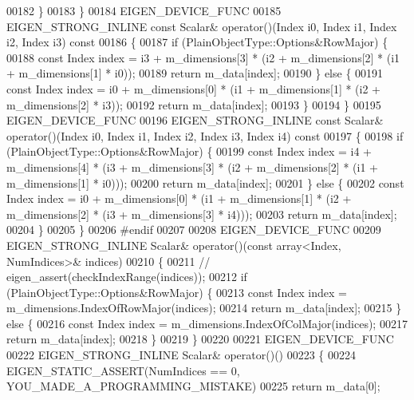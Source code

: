 \begin{DoxyCode}
00182       \}
00183     \}
00184     EIGEN\_DEVICE\_FUNC
00185     EIGEN\_STRONG\_INLINE \textcolor{keyword}{const} Scalar& operator()(Index i0, Index i1, Index i2, Index i3)\textcolor{keyword}{ const}
00186 \textcolor{keyword}{    }\{
00187       \textcolor{keywordflow}{if} (PlainObjectType::Options&RowMajor) \{
00188         \textcolor{keyword}{const} Index index = i3 + m\_dimensions[3] * (i2 + m\_dimensions[2] * (i1 + m\_dimensions[1] * i0));
00189         \textcolor{keywordflow}{return} m\_data[index];
00190       \} \textcolor{keywordflow}{else} \{
00191         \textcolor{keyword}{const} Index index = i0 + m\_dimensions[0] * (i1 + m\_dimensions[1] * (i2 + m\_dimensions[2] * i3));
00192         \textcolor{keywordflow}{return} m\_data[index];
00193       \}
00194     \}
00195     EIGEN\_DEVICE\_FUNC
00196     EIGEN\_STRONG\_INLINE \textcolor{keyword}{const} Scalar& operator()(Index i0, Index i1, Index i2, Index i3, Index i4)\textcolor{keyword}{ const}
00197 \textcolor{keyword}{    }\{
00198       \textcolor{keywordflow}{if} (PlainObjectType::Options&RowMajor) \{
00199         \textcolor{keyword}{const} Index index = i4 + m\_dimensions[4] * (i3 + m\_dimensions[3] * (i2 + m\_dimensions[2] * (i1 + 
      m\_dimensions[1] * i0)));
00200         \textcolor{keywordflow}{return} m\_data[index];
00201       \} \textcolor{keywordflow}{else} \{
00202         \textcolor{keyword}{const} Index index = i0 + m\_dimensions[0] * (i1 + m\_dimensions[1] * (i2 + m\_dimensions[2] * (i3 + 
      m\_dimensions[3] * i4)));
00203         \textcolor{keywordflow}{return} m\_data[index];
00204       \}
00205     \}
00206 \textcolor{preprocessor}{#endif}
00207 
00208     EIGEN\_DEVICE\_FUNC
00209     EIGEN\_STRONG\_INLINE Scalar& operator()(\textcolor{keyword}{const} array<Index, NumIndices>& indices)
00210     \{
00211       \textcolor{comment}{//      eigen\_assert(checkIndexRange(indices));}
00212       \textcolor{keywordflow}{if} (PlainObjectType::Options&RowMajor) \{
00213         \textcolor{keyword}{const} Index index = m\_dimensions.IndexOfRowMajor(indices);
00214         \textcolor{keywordflow}{return} m\_data[index];
00215       \} \textcolor{keywordflow}{else} \{
00216         \textcolor{keyword}{const} Index index = m\_dimensions.IndexOfColMajor(indices);
00217         \textcolor{keywordflow}{return} m\_data[index];
00218       \}
00219     \}
00220 
00221     EIGEN\_DEVICE\_FUNC
00222     EIGEN\_STRONG\_INLINE Scalar& operator()()
00223     \{
00224       EIGEN\_STATIC\_ASSERT(NumIndices == 0, YOU\_MADE\_A\_PROGRAMMING\_MISTAKE)
00225       \textcolor{keywordflow}{return} m\_data[0];

\end{DoxyCode}
